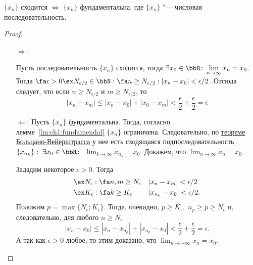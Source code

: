 \begin{thm} 
$\{x_n\}$ сходится $\Longleftrightarrow$ $\{x_n\}$ фундаментальна, где $\{x_n\}$ "--- числовая последовательность.
\end{thm}
\begin{proof}\leavevmode
\begin{itemize}[wide, labelwidth=!, labelindent=0pt]
\item[$\Longrightarrow$:]

Пусть последовательность $\{x_n\}$ сходится, тогда $\exists x_{0} \in \bbR\colon  \lim_{n \to \infty}\limits x_n = x_0$. Тогда $\\ \fa \epsilon > 0 \ex N_{\epsilon/2} \in \bbN: \fa n \ge N_{\epsilon/2} : |x_n-x_0|<\epsilon/2$. Отсюда следует, что если $n \ge N_{\epsilon/2}$ и $m \ge N_{\epsilon/2}$, то
$$
|x_n-x_m| \le |x_n-x_0|+|x_0-x_m| <\frac{\epsilon}{2}+\frac{\epsilon}{2}=\epsilon
$$

\item[$\Longleftarrow$:]
Пусть $\{x_n\}$ фундаментальна. Тогда, согласно лемме~\ref{lm:ch1:fundamendal} $\{x_n\}$ ограничена. Следовательно, по \hyperref[th:ch1:TBV]{теореме Больцано-Вейерштрасса} у нее есть сходящаяся подпоследовательность $\{x_{n_k}\}: \;\exists x_0 \in \bbR\colon$ $\lim_{k \to \infty}\limits x_{n_k} =x_0 $. Докажем, что $\lim_{n \to \infty}\limits x_{n}=x_0 $.

Зададим некоторое $\epsilon > 0$. Тогда
\begin{gather*}
\begin{aligned}
& \ex N_\epsilon : \fa n,m \ge N_\epsilon &&|x_n-x_m|<\epsilon/2\\
& \ex K_\epsilon : \fa k \ge K_\epsilon   &&|x_{n_k}-x_0|<\epsilon/2.
\end{aligned}
\end{gather*}
Положим $p=\max\{N_\epsilon;K_\epsilon\}$. Тогда, очевидно, $p \ge K_\epsilon,\; n_p \ge p \ge N_\epsilon$ и, следовательно, для любого $n \ge N_\epsilon$
$$
|x_n-x_0| \le |x_n-x_{n_p}|+|x_{n_p}-x_0|<\frac{\epsilon}{2}+\frac{\epsilon}{2}=\epsilon.
$$
А так как $\epsilon > 0$ любое, то этим доказано, что $\lim_{n \to +\infty}\limits x_n = x_0$. \qedhere
\end{itemize}
\end{proof}
